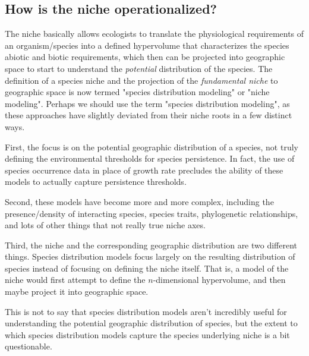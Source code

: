 \documentclass[12pt]{article}
\begin{document}
\subsection*{How is the niche operationalized?}

The niche basically allows ecologists to translate the physiological requirements of an organism/species into a defined hypervolume that characterizes the species abiotic and biotic requirements, which then can be projected into geographic space to start to understand the \textit{potential} distribution of the species. The definition of a species niche and the projection of the \textit{fundamental niche} to geographic space is now termed "species distribution modeling" or "niche modeling". Perhaps we should use the term "species distribution modeling", as these approaches have slightly deviated from their niche roots in a few distinct ways. 

First, the focus is on the potential geographic distribution of a species, not truly defining the environmental thresholds for species persistence. In fact, the use of species occurrence data in place of growth rate precludes the ability of these models to actually capture persistence thresholds. 

Second, these models have become more and more complex, including the presence/density of interacting species, species traits, phylogenetic relationships, and lots of other things that not really true niche axes. 

Third, the niche and the corresponding geographic distribution are two different things. Species distribution models focus largely on the resulting distribution of species instead of focusing on defining the niche itself. That is, a model of the niche would first attempt to define the $n$-dimensional hypervolume, and then maybe project it into geographic space.


This is not to say that species distribution models aren't incredibly useful for understanding the potential geographic distribution of species, but the extent to which species distribution models capture the species underlying niche is a bit questionable. 
\end{document}
